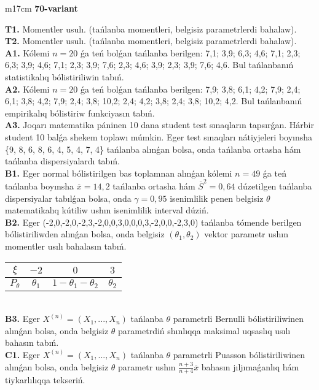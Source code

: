 \documentclass{article}
\begin{document}
\begin{tabular}{m{17cm}}
\textbf{70-variant}
\newline

\textbf{T1.} 
Momentler usulı. (tańlanba momentleri, belgisiz parametrlerdi bahalaw).
 \\
\textbf{T2.} 
Momentler usulı. (tańlanba momentleri, belgisiz parametrlerdi bahalaw).
 \\
\textbf{A1.} 
Kólemi \(n = 20\) ǵa teń bolǵan tańlanba berilgen: 7,1; 3,9; 6,3; 4,6; 7,1; 2,3; 6,3; 3,9; 4,6; 7,1; 2,3; 3,9; 7,6; 2,3; 4,6; 3,9; 2,3; 3,9; 7,6; 4,6. Bul tańlanbanıń statistikalıq bólistiriliwin tabıń.
 \\
\textbf{A2.} 
Kólemi \(n = 20\) ǵa teń bolǵan tańlanba berilgen: 7,9; 3,8; 6,1; 4,2; 7,9; 2,4; 6,1; 3,8; 4,2; 7,9; 2,4; 3,8; 10,2; 2,4; 4,2; 3,8; 2,4; 3,8; 10,2; 4,2. Bul tańlanbanıń empirikalıq bólistiriw funkciyasın tabıń.
 \\
\textbf{A3.} 
Joqarı matematika páninen 10 dana student test sınaqların tapsırǵan. Hárbir student 10 balǵa shekem toplawı múmkin. Eger test sınaqları nátiyjeleri boyınsha \{9, 8, 6, 8, 6, 4, 5, 4, 7, 4\} tańlanba alınǵan bolsa, onda tańlanba ortasha hám tańlanba dispersiyalardı tabıń.
 \\
\textbf{B1.} 
Eger normal bólistirilgen bas toplamnan alınǵan kólemi \(n = 49\) ǵa teń tańlanba boyınsha \(\overline{x} = 14,2\) tańlanba ortasha hám \({\overline{S}}^{2} = 0,64\) dúzetilgen tańlanba dispersiyalar tabılǵan bolsa, onda \(\gamma = 0,95\) isenimlilik penen belgisiz \(\theta\) matematikalıq kútiliw ushın isenimlilik interval dúziń.
 \\
\textbf{B2.} 
Eger (-2,0,-2,0,-2,3,-2,0,0,3,0,0,0,3,-2,0,0,-2,3,0) tańlanba tómende berilgen bólistiriliwden alınǵan bolsa, onda belgisiz \(\left( \theta_{1},\theta_{2} \right)\) vektor parametr ushın momentler usılı bahalasın tabıń.
\begin{tabular}{|c|c|c|c|}
  \hline
$\xi$ &
$- 2$ &
$0$ &
$3$\\
\hline
\(P_{\theta}\) & \(\theta_{1}\) & \(1 - \theta_{1} - \theta_{2}\) & \(\theta_{2}\) \\
\hline
\end{tabular}
 \\
\textbf{B3.} 
Eger \(X^{(n)} = \left( X_{1},...,X_{n} \right)\) tańlanba \(\theta\) parametrli Bernulli bólistiriliwinen alınǵan bolsa, onda belgisiz \(\theta\) parametrdiń shınlıqqa maksimal uqsaslıq usılı bahasın tabıń.
 \\
\textbf{C1.} 
Eger \(X^{(n)} = \left( X_{1},...,X_{n} \right)\) tańlanba \(\theta\) parametrli Puasson bólistiriliwinen alınǵan bolsa, onda belgisiz \(\theta\) parametr ushın \(\frac{n + 3}{n + 4}\overline{x}\) bahasın jıljımaǵanlıq hám tiykarlılıqqa tekseriń.

\end{tabular}
\end{document}
